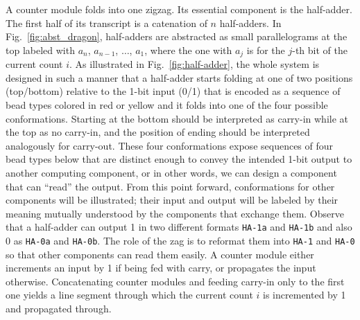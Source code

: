 A counter module folds into one zigzag. 
Its essential component is the half-adder. 
The first half of its transcript is a catenation of $n$ half-adders. 
In Fig.~\ref{fig:abst_dragon}, half-adders are abstracted as small parallelograms at the top labeled with $a_n$, $a_{n-1}$, $\ldots$, $a_1$, where the one with $a_j$ is for the $j$-th bit of the current count $i$. 
As illustrated in Fig.~\ref{fig:half-adder}, the whole system is designed in such a manner that a half-adder starts folding at one of two positions (top/bottom) relative to the 1-bit input (0/1) that is encoded as a sequence of bead types colored in red or yellow and it folds into one of the four possible conformations. 
Starting at the bottom should be interpreted as carry-in while at the top as no carry-in, and the position of ending should be interpreted analogously for carry-out. 
These four conformations expose sequences of four bead types below that are distinct enough to convey the intended 1-bit output to another computing component, or in other words, we can design a component that can ``read'' the output. 
From this point forward, conformations for other components will be illustrated; their input and output will be labeled by their meaning mutually understood by the components that exchange them. 
Observe that a half-adder can output 1 in two different formats {\tt HA-1a} and {\tt HA-1b} and also 0 as {\tt HA-0a} and {\tt HA-0b}. 
The role of the zag is to reformat them into {\tt HA-1} and {\tt HA-0} so that other components can read them easily. 
A counter module either increments an input by 1 if being fed with carry, or propagates the input otherwise. 
Concatenating counter modules and feeding carry-in only to the first one yields a line segment through which the current count $i$ is incremented by 1 and propagated through. 


